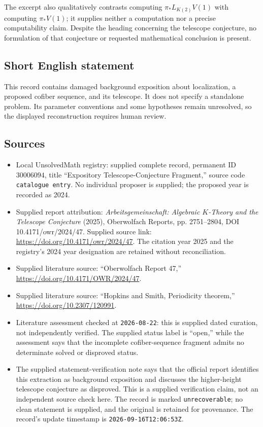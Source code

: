 \documentclass[11pt]{article}
\begin{document}
The excerpt also qualitatively contrasts computing \(\pi_*L_{K(2)}V(1)\) with computing \(\pi_*V(1)\); it supplies neither a computation nor a precise computability claim. Despite the heading concerning the telescope conjecture, no formulation of that conjecture or requested mathematical conclusion is present.
\subsection{Short English statement}
This record contains damaged background exposition about localization, a proposed cofiber sequence, and its telescope. It does not specify a standalone problem. Its parameter conventions and some hypotheses remain unresolved, so the displayed reconstruction requires human review.
\subsection{Sources}
\begin{itemize}
\item Local UnsolvedMath registry: supplied complete record, permanent ID \(30006094\), title ``Expository Telescope-Conjecture Fragment,'' source code \texttt{catalogue entry}. No individual proposer is supplied; the proposed year is recorded as 2024.
\item Supplied report attribution: \emph{Arbeitsgemeinschaft: Algebraic \(K\)-Theory and the Telescope Conjecture} (2025), Oberwolfach Reports, pp. 2751--2804, DOI 10.4171/owr/2024/47. Supplied source link: \url{https://doi.org/10.4171/owr/2024/47}. The citation year 2025 and the registry's 2024 year designation are retained without reconciliation.
\item Supplied literature source: ``Oberwolfach Report 47,'' \url{https://doi.org/10.4171/OWR/2024/47}.
\item Supplied literature source: ``Hopkins and Smith, Periodicity theorem,'' \url{https://doi.org/10.2307/120991}.
\item Literature assessment checked at \texttt{2026-08-22}: this is supplied dated curation, not independently verified. The supplied status label is ``open,'' while the assessment says that the incomplete cofiber-sequence fragment admits no determinate solved or disproved status.
\item The supplied statement-verification note says that the official report identifies this extraction as background exposition and discusses the higher-height telescope conjecture as disproved. This is a supplied verification claim, not an independent source check here. The record is marked \texttt{unrecoverable}; no clean statement is supplied, and the original is retained for provenance. The record's update timestamp is \texttt{2026-09-16T12:06:53Z}.
\end{itemize}
\end{document}
